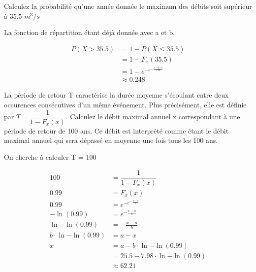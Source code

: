\begin{exo}
	\begin{subexo}{Calculez la probabilité qu'une année donnée le maximum des débits soit supérieur à $35.5$  $m^3/s$}
  		\begin{center}
  			La fonction de répartition étant déjà donnée avec a et b,
  		\end{center}
		\begin{align*}
			P(X > 35.5) &= 1 - P(X \leq 35.5) \\
			&= 1 - F_x(35.5) \\
	  		&= 1 - e^{-e^{-\frac{x-25.5}{7.98}}}\\
	  		&\approx 0.248
	 	\end{align*}
  	\end{subexo}
  	\begin{subexo}{La période de retour T caractérise la durée moyenne s'écoulant entre deux occurences consécutives d'un même événement. Plus précisément, elle est définie par $ T = \dfrac{1}{1- F_x(x)}$. Calculez le débit maximal annuel x correspondant à une période de retour de 100 ans. Ce débit est interprété comme étant le débit maximal annuel qui sera dépassé en moyenne une fois tous les 100 ans.}
	\begin{center}
		On cherche à calculer T = 100
	\end{center}
	\begin{align*}
		100 &=  \dfrac{1}{1- F_x(x)}\\
		0.99 &= F_x(x) \\
		0.99 &= e^{-e^{-\frac{x-a}{b}}} \\
		-\ln(0.99) &= e^{-\frac{x-a}{b}} \\ 
		\ln{-\ln(0.99)} &= -\frac{x-a}{b} \\ 
		b\cdot \ln{-\ln(0.99)} &= a-x \\ 
		x &= a-b\cdot \ln{-\ln(0.99)} \\ 
		&= 25.5 -7.98\cdot \ln{-\ln(0.99)} \\
		&\approx 62.21
	\end{align*}
	\end{subexo}
\end{exo}
